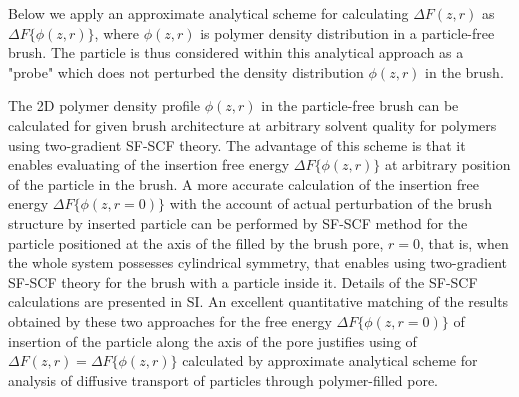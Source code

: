 \documentclass[12pt, a4paper]{article}
\begin{document}


Below we apply an approximate analytical scheme for calculating $\Delta F(z,r)$ as $\Delta F\{\phi(z,r)\}$, where $\phi(z,r)$ is polymer density distribution in a particle-free brush.
The particle is thus considered within this analytical approach as a "probe" which does not perturbed the density distribution $\phi(z,r)$ in the brush. 

The 2D polymer density profile $\phi(z,r)$ in the particle-free brush can be calculated 
for given brush architecture at arbitrary solvent quality for polymers using two-gradient SF-SCF theory.
The advantage of this scheme is that it enables evaluating of the insertion free energy $\Delta F\{\phi(z,r)\}$ at arbitrary position of the particle in the brush.
A more accurate calculation of the insertion free energy $\Delta F\{\phi(z,r=0)\}$ with the account of actual perturbation of the brush structure by inserted particle can be performed by SF-SCF method
for the particle positioned at the axis of the filled by the brush pore, $r=0$, that is, when the whole system possesses cylindrical symmetry, 
that enables using two-gradient SF-SCF theory for the brush with a particle inside it.
Details of the SF-SCF calculations are presented in SI.
An excellent quantitative matching of the results obtained by these two approaches for the free energy $\Delta F\{\phi(z,r=0)\}$
of insertion of the particle along the axis of the pore justifies using of $\Delta F(z,r)=\Delta F\{\phi(z,r)\}$ calculated by approximate analytical scheme for analysis of diffusive transport of particles 
through polymer-filled pore. 


\end{document}
